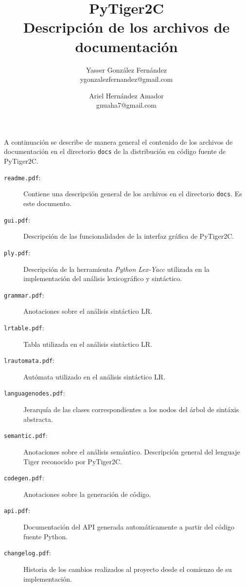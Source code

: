 \documentclass{article}
\title{
    \LARGE{PyTiger2C} \\
    \Large{Descripción de los archivos de documentación}
}
\author{
    Yasser González Fernández \\
    \small{ygonzalezfernandez@gmail.com}
    \and
    Ariel Hernández Amador \\
    \small{gnuaha7@gmail.com}
}
\date{}
\begin{document}
\maketitle

\thispagestyle{empty}

\newpage

\setcounter{page}{1}

A continuación se describe de manera general el contenido de los archivos de
documentación en el directorio \texttt{docs} de la distribución en código
fuente de PyTiger2C.

\begin{description}
\item[\texttt{readme.pdf}:] Contiene una descripción general de los archivos en
  el directorio \texttt{docs}. Es este documento.

\item[\texttt{gui.pdf}:] Descripción de las funcionalidades de la interfaz
  gráfica de PyTiger2C.

\item[\texttt{ply.pdf}:] Descripción de la herramienta \emph{Python Lex-Yacc}
  utilizada en la implementación del análisis lexicográfico y sintáctico.

\item[\texttt{grammar.pdf}:] Anotaciones sobre el análisis sintáctico LR.

\item[\texttt{lrtable.pdf}:] Tabla utilizada en el análisis sintáctico LR.

\item[\texttt{lrautomata.pdf}:] Autómata utilizado en el análisis sintáctico LR.

\item[\texttt{languagenodes.pdf}:] Jerarquía de las clases correspondientes
  a los nodos del árbol de sintáxis abstracta.

\item[\texttt{semantic.pdf}:] Anotaciones sobre el análisis semántico.
  Descripción general del lenguaje Tiger reconocido por PyTiger2C.

\item[\texttt{codegen.pdf}:] Anotaciones sobre la generación de código.

\item[\texttt{api.pdf}:] Documentación del API generada automáticamente a
  partir del código fuente Python.

\item[\texttt{changelog.pdf}:] Historia de los cambios realizados al proyecto
  desde el comienzo de su implementación.

\end{description}
\end{document}
